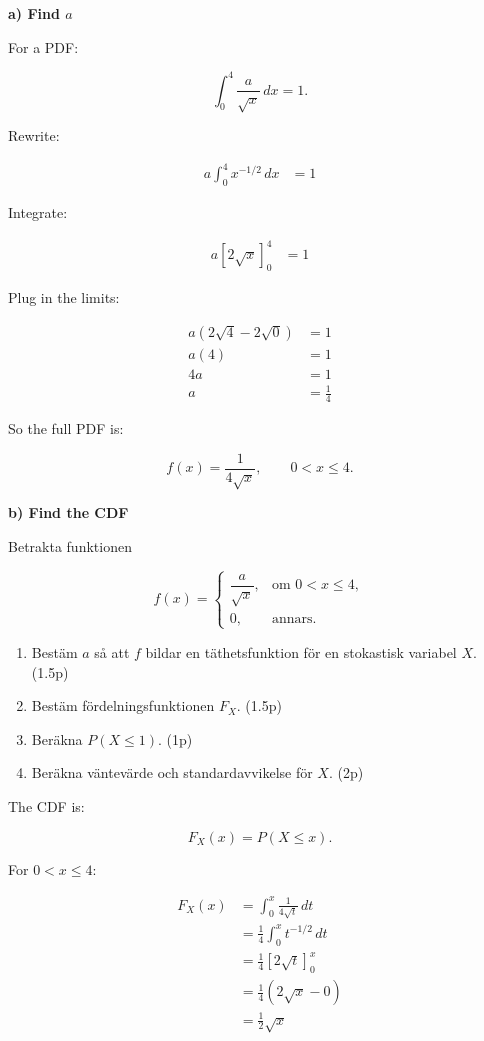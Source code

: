 \documentclass[10pt]{article}
\begin{document}
\textbf{a) Find $a$}

For a PDF:

\[
\int_0^4 \frac{a}{\sqrt{x}}\,dx=1.
\]

Rewrite:

\begin{align*}
a\int_0^4 x^{-1/2}\,dx
&=1
\end{align*}

Integrate:

\begin{align*}
a\left[
2\sqrt{x}
\right]_0^4
&=1
\end{align*}

Plug in the limits:

\begin{align*}
a(2\sqrt{4}-2\sqrt{0})
&=1 \\[2mm]
a(4)
&=1 \\[2mm]
4a
&=1 \\[2mm]
a
&=\frac{1}{4}
\end{align*}

So the full PDF is:

\[
f(x)=\frac{1}{4\sqrt{x}},
\qquad 0<x\leq 4.
\]

\textbf{b) Find the CDF}

Betrakta funktionen

\[
f(x)=
\begin{cases}
\dfrac{a}{\sqrt{x}},
& \text{om } 0<x\leq 4,\\
0,
& \text{annars.}
\end{cases}
\]

\begin{enumerate}[label=\alph*)]
\item
Bestäm $a$ så att $f$ bildar en täthetsfunktion för en stokastisk
variabel $X$.
\hfill (1.5p)

\item
Bestäm fördelningsfunktionen $F_X$.
\hfill (1.5p)

\item
Beräkna $P(X\leq 1)$.
\hfill (1p)

\item
Beräkna väntevärde och standardavvikelse för $X$.
\hfill (2p)
\end{enumerate}

The CDF is:

\[
F_X(x)=P(X\leq x).
\]

For $0<x\leq 4$:

\begin{align*}
F_X(x)
&=
\int_0^x
\frac{1}{4\sqrt{t}}\,dt \\[2mm]
&=
\frac{1}{4}
\int_0^x
t^{-1/2}\,dt \\[2mm]
&=
\frac{1}{4}
\left[
2\sqrt{t}
\right]_0^x \\[2mm]
&=
\frac{1}{4}
(2\sqrt{x}-0) \\[2mm]
&=
\frac{1}{2}\sqrt{x}
\end{align*}
\end{document}

